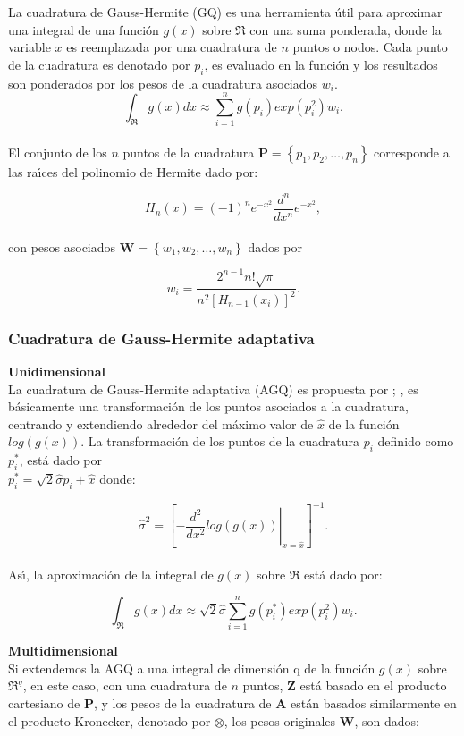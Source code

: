 La cuadratura de Gauss-Hermite (GQ) es una herramienta \'{u}til para aproximar una integral de una funci\'{o}n $g(x)$ sobre $\Re$ con una suma ponderada, donde la variable $x$ es reemplazada por una cuadratura de $n$ puntos o nodos. Cada punto de la cuadratura es denotado por $p_i$, es evaluado en la funci\'{o}n y los resultados son ponderados por los pesos de la cuadratura asociados $w_i$.
\[
\int_\Re{g(x)dx}\approx\sum_{i=1}^{n}{g(p_i)exp(p_i^2)w_i.}
\]
\\
El conjunto de los $n$ puntos de la cuadratura $\textbf{P}=\left\{p_1,p_2,\ldots,p_n\right\}$ corresponde a las ra\'{\i}ces del polinomio de Hermite dado por:

\[
H_n{(x)}=(-1)^ne^{-x^2}\frac{d^n}{dx^n}e^{-x^2},
\]
\\
con pesos asociados $\textbf{W}=\left\{w_1,w_2,\ldots,w_n\right\}$ dados por

\[
w_i=\frac{2^{n-1}n!\sqrt{\pi}}{n^2{[H_{n-1}(x_i)]}^2}.
\]

\subsubsection{Cuadratura de Gauss-Hermite adaptativa}

\textbf{Unidimensional\\}
La cuadratura de Gauss-Hermite adaptativa (AGQ) es propuesta por \cite{Liu1}; \citep{Pinheiro1}, es b\'{a}sicamente una transformaci\'{o}n de los puntos asociados a la cuadratura, centrando y extendiendo alrededor del m\'{a}ximo valor de $\hat{x}$ de la funci\'{o}n $log(g(x))$. La transformaci\'{o}n de los puntos de la cuadratura $p_i$ definido como $p_i^*$, est\'{a} dado por \\
$p_i^*=\sqrt{2}\hat{\sigma}p_i+\hat{x}$ donde:

\[
\hat{\sigma}^2={\left[\left. -\frac{d^2}{dx^2}log(g(x))\right|_{x=\hat{x}}\right]^{-1}}.
\]
\\
As\'{\i}, la aproximaci\'{o}n de la integral de $g(x)$ sobre $\Re$ est\'{a} dado por:

\[
\int_\Re{g(x)dx}\approx\sqrt{2}\hat{\sigma}\sum_{i=1}^{n}{g(p_i^*)exp(p_i^2)w_i.}
\]

\textbf{Multidimensional\\}
Si extendemos la AGQ a una integral de dimensi\'{o}n q de la funci\'{o}n $g(x)$ sobre $\Re^q$, en este caso, con una cuadratura de $n$ puntos, $\textbf{Z}$ est\'{a} basado en el producto cartesiano de $\textbf{P}$, y los pesos de la cuadratura de $\textbf{A}$ est\'{a}n basados similarmente en el producto Kronecker, denotado por $\otimes$, los pesos originales $\textbf{W}$, son dados:

